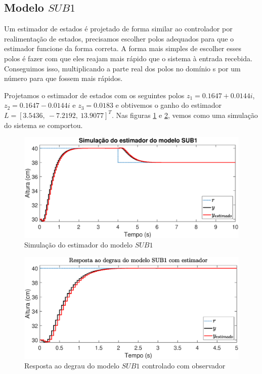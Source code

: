 \subsection{Modelo $SUB1$}\label{s:estsub1}
Um estimador de estados é projetado de forma similar ao controlador por realimentação de estados, precisamos escolher polos adequados para que o estimador funcione da forma correta. A forma mais simples de escolher esses polos é fazer com que eles reajam mais rápido que o sistema à entrada recebida. Conseguimos isso, multiplicando a parte real dos polos no domínio s por um número para que fossem mais rápidos. 


Projetamos o estimador de estados com os seguintes polos $z_1=0.1647 + 0.0144i$, $z_2=0.1647 - 0.0144i$ e $z_3=0.0183$ e obtivemos o ganho do estimador $L=[3.5436,~-7.2192,~13.9077]^T$. Nas figuras \ref{fig:estimadorsub1} e \ref{fig:stepestsub1}, vemos como uma simulação do sistema se comportou.

\begin{figure}[H]
	\centering
	\includegraphics[width=1\linewidth]{estimadorsub1}
	\caption[Simulação do estimador do modelo $SUB1$]{Simulação do estimador do modelo $SUB1$}
	\label{fig:estimadorsub1}
\end{figure}

\begin{figure}[H]
	\centering
	\includegraphics[width=1\linewidth]{stepestsub1}
	\caption[Resposta ao degrau do modelo $SUB1$ controlado com observador]{Resposta ao degrau do modelo $SUB1$ controlado com observador}
	\label{fig:stepestsub1}
\end{figure}



